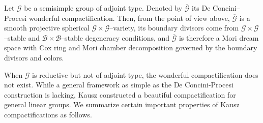 \documentclass[10pt]{amsart}
\theoremstyle{definition}
\theoremstyle{plain} %
\begin{document}
Let $\mathscr{G}$ be a semisimple group of adjoint type. Denoted by $\overline{\mathscr{G}}$ its De Concini--Procesi  wonderful compactification.
Then, from the point of view above,  $\overline{\mathscr{G}}$  is a smooth projective spherical $\mathscr{G}\times \mathscr{G}$--variety,
its boundary divisors come from $\mathscr{G}\times \mathscr{G}$--stable and $\mathscr{B}\times \mathscr{B}$--stable degeneracy conditions, and
$\overline{\mathscr{G}}$  is therefore a Mori dream space with Cox ring and Mori chamber decomposition governed by the boundary divisors and colors.

When $\mathscr G$ is reductive but not of adjoint type, the wonderful compactification does not exist. While a general framework as simple as the De Concini-Procesi construction is lacking, Kausz constructed a beautiful compactification for general linear groups. We summarize certain important properties of Kausz compactifications as follows.
\end{document}
